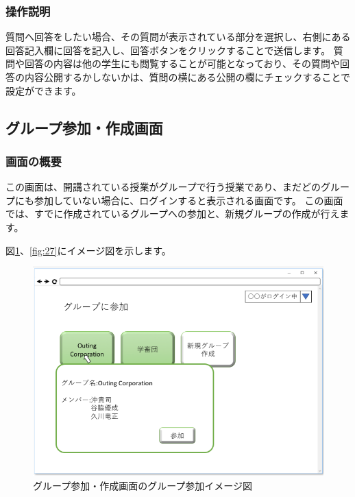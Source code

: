 \subsubsection{操作説明}
質問へ回答をしたい場合、その質問が表示されている部分を選択し、右側にある回答記入欄に回答を記入し、回答ボタンをクリックすることで送信します。
質問や回答の内容は他の学生にも閲覧することが可能となっており、その質問や回答の内容公開するかしないかは、質問の横にある公開の欄にチェックすることで設定ができます。

\newpage

\subsection{グループ参加・作成画面}
\subsubsection{画面の概要}
この画面は、開講されている授業がグループで行う授業であり、まだどのグループにも参加していない場合に、ログインすると表示される画面です。
この画面では、すでに作成されているグループへの参加と、新規グループの作成が行えます。

図\ref{fig:26}、\ref{fig:27}にイメージ図を示します。

\begin{figure}[htbp]
\begin{center}
  \includegraphics[width=1\linewidth,clip]{./img/26.png}
  \caption{グループ参加・作成画面のグループ参加イメージ図}\label{fig:26}
\end{center}
\end{figure}

